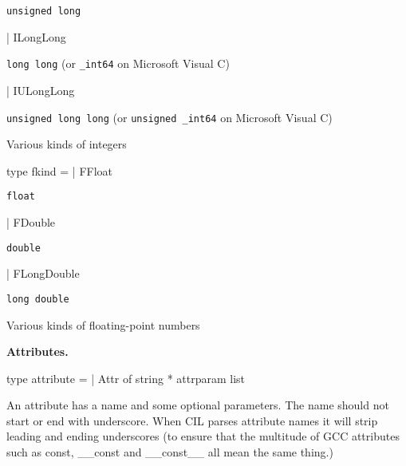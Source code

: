 \documentclass[11pt]{article}
\begin{document}
\begin{ocamldoccomment}
{\tt{unsigned long}}
\end{ocamldoccomment}
\begin{ocamldoccode}
  | ILongLong
\end{ocamldoccode}
\begin{ocamldoccomment}
{\tt{long long}} (or {\tt{\_int64}} on Microsoft Visual C)
\end{ocamldoccomment}
\begin{ocamldoccode}
  | IULongLong
\end{ocamldoccode}
\begin{ocamldoccomment}
{\tt{unsigned long long}} (or {\tt{unsigned \_int64}} on Microsoft 
                    Visual C)
\end{ocamldoccomment}
\begin{ocamldocdescription}
Various kinds of integers


\end{ocamldocdescription}




\label{type:Cil.fkind}\begin{ocamldoccode}
type fkind =
  | FFloat
\end{ocamldoccode}
\begin{ocamldoccomment}
{\tt{float}}
\end{ocamldoccomment}
\begin{ocamldoccode}
  | FDouble
\end{ocamldoccode}
\begin{ocamldoccomment}
{\tt{double}}
\end{ocamldoccomment}
\begin{ocamldoccode}
  | FLongDouble
\end{ocamldoccode}
\begin{ocamldoccomment}
{\tt{long double}}
\end{ocamldoccomment}
\begin{ocamldocdescription}
Various kinds of floating-point numbers


\end{ocamldocdescription}




{\bf Attributes.}



\label{type:Cil.attribute}\begin{ocamldoccode}
type attribute =
  | Attr of string * attrparam list
\end{ocamldoccode}
\begin{ocamldoccomment}
An attribute has a name and some optional parameters. The name should not 
 start or end with underscore. When CIL parses attribute names it will 
 strip leading and ending underscores (to ensure that the multitude of GCC 
 attributes such as const, \_\_const and \_\_const\_\_ all mean the same thing.)
\end{ocamldoccomment}
\end{document}
